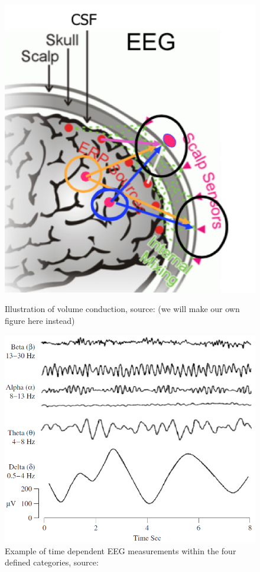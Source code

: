 \begin{figure}[H]
    \begin{minipage}[t]{.45\textwidth}
        \centering
        \includegraphics[width=\textwidth]{figurs/scalp.png}
        \caption{Illustration of volume conduction, source: \cite{phd2015}(we will make our own figure here instead)}\label{fig:volumeconduction}
    \end{minipage} 
    \hfill
    \begin{minipage}[t]{.45\textwidth}
        \centering
        \includegraphics[width=\textwidth]{figurs/EEG_example.png}
        \caption{Example of time dependent EEG measurements within the four defined categories, source: \cite{EEGsignalprocessing}}\label{fig:EEG_example}
    \end{minipage}
\end{figure}

